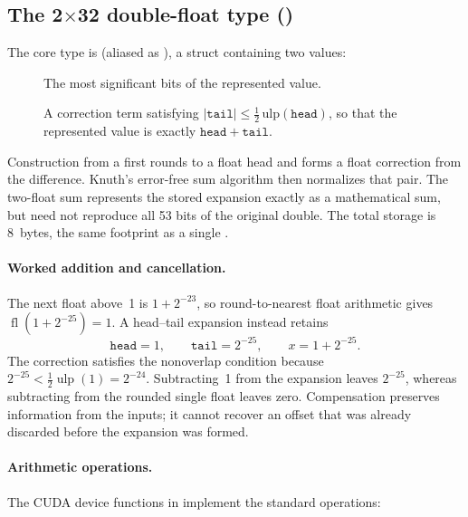 \subsection{The 2\texorpdfstring{$\times$}{x}32 double-float type ()}
\label{subsec:ep-dblflt}

The core type is  (aliased as ), a struct
containing two  values:
\begin{description}
  \item[] The most significant bits of the represented value.
  \item[] A correction term satisfying
    $|\mathtt{tail}| \le \tfrac{1}{2}\,\mathrm{ulp}(\mathtt{head})$,
    so that the represented value is exactly $\mathtt{head} + \mathtt{tail}$.
\end{description}
Construction from a  first rounds to a float head and forms a float
correction from the difference. Knuth's error-free sum algorithm
\cite{Knuth1997TAOCP2} then normalizes that pair. The two-float sum represents
the stored expansion exactly as a mathematical sum, but need not reproduce all
53 bits of the original double. The total storage is 8~bytes, the same footprint
as a single .

\paragraph{Worked addition and cancellation.}
The next float above~1 is $1+2^{-23}$, so round-to-nearest float arithmetic gives
$\operatorname{fl}(1+2^{-25})=1$. A head--tail expansion instead retains
\[
\mathtt{head}=1,\qquad \mathtt{tail}=2^{-25},\qquad
x=1+2^{-25}.
\]
The correction satisfies the nonoverlap condition because
$2^{-25}<\tfrac12\operatorname{ulp}(1)=2^{-24}$. Subtracting~1 from the
expansion leaves $2^{-25}$, whereas subtracting from the rounded single float
leaves zero. Compensation preserves information from the inputs; it cannot
recover an offset that was already discarded before the expansion was formed.

\paragraph{Arithmetic operations.}
The CUDA device functions in  implement the standard
operations:

